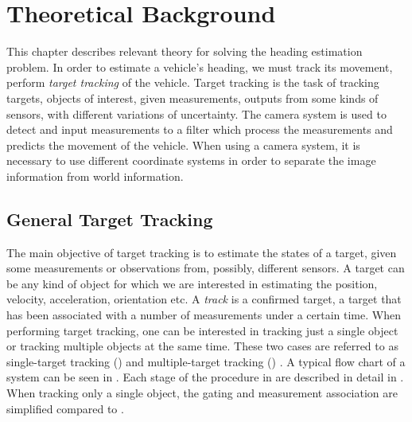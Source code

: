 \chapter{Theoretical Background}
\label{cha:theory}

This chapter describes relevant theory for solving the heading estimation problem.
In order to estimate a vehicle's heading, we must track its movement, \ie perform \textit{target tracking} of the vehicle.
Target tracking is the task of tracking targets, objects of interest, given measurements, outputs from some kinds of sensors, with different variations of uncertainty.
The camera system is used to detect and input measurements to a filter which process the measurements and predicts the movement of the vehicle.
When using a camera system, it is necessary to use different coordinate systems in order to separate the image information from world information.

\section{General Target Tracking}
The main objective of target tracking is to estimate the states of a target, given some measurements or observations from, possibly, different sensors.
A target can be any kind of object for which we are interested in estimating \eg the position, velocity, acceleration, orientation etc.
A \textit{track} is a confirmed target, \ie a target that has been associated with a number of measurements under a certain time.
When performing target tracking, one can be interested in tracking just a single object or tracking multiple objects at the same time.
These two cases are referred to as single-target tracking (\abbrSTT) and multiple-target tracking (\abbrMTT) \cite{Blackman:1999}.
A typical flow chart of a \abbrMTT system can be seen in .
Each stage of the procedure in  are described in detail in .
When tracking only a single object, the gating and measurement association are simplified compared to \abbrMTT.

